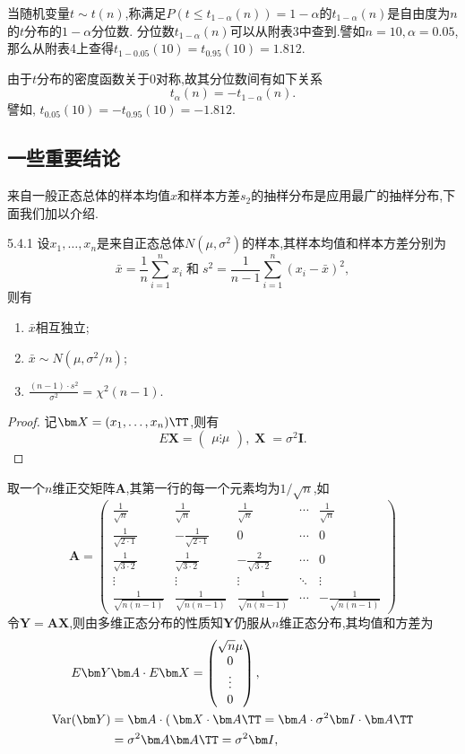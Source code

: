 当随机变量$t\sim t(n)$,称满足$P(t\leq t_{1-\alpha}(n))=1-\alpha$的$t_{1-\alpha}(n)$是自由度为$n$的$t$分布的$1-\alpha$分位数. 分位数$t_{1-\alpha}(n)$可以从附表3中查到.譬如$n=10,\alpha=0.05$,那么从附表4上查得$t_{1-0.05}(10)=t_{0.95}(10)=1.812$.

由于$t$分布的密度函数关于0对称,故其分位数间有如下关系
\begin{equation}\label{eq:5.4.2}
t_\alpha(n)=-t_{1-\alpha}(n).
\end{equation}
譬如, $t_{0.05}(10)=-t_{0.95}(10)=-1.812$.
\subsection{一些重要结论}
来自一般正态总体的样本均值$x$和样本方差$s_2$的抽样分布是应用最广的抽样分布,下面我们加以介绍.
\begin{theorem}{}{5.4.1}
设$x_1,\dotsc,x_n$是来自正态总体$N(\mu,\sigma^2)$的样本,其样本均值和样本方差分别为
\[\bar x=\frac1n\sum_{i=1}^nx_i\;\text{和}\;s^2=\frac1{n-1}\sum_{i=1}^n(x_i-\bar x)^2,\]
则有
\begin{enumerate}[label=(\arabic*)]
\item $\bar x$相互独立;
\item $\bar x\sim N(\mu,\sigma^2/n)$;
\item $\frac{(n-1)\cdot s^2}{\sigma^2}=\chi^2(n-1)$.
\end{enumerate}
\end{theorem}
\begin{proof}
记$\bm X=(x_1,\dotsc,x_n)\TT$,则有
\[E\bm X=\begin{pmatrix}
\mu\vdots\mu
\end{pmatrix},\operatorname{\bm X}=\sigma^2 \bm I.\]
\end{proof}
取一个$n$维正交矩阵$\bm A$,其第一行的每一个元素均为$1/\sqrt n$,如
\[\bm A=\begin{pmatrix}
\frac1{\sqrt n}&\frac{1}{\sqrt n}&\frac1{\sqrt n}&\cdots&\frac1{\sqrt n}\\
\frac1{\sqrt{2\cdot1}}&-\frac1{\sqrt{2\cdot1}}&0&\cdots&0\\
\frac1{\sqrt{3\cdot2}}&\frac1{\sqrt{3\cdot2}}&-\frac2{\sqrt{3\cdot2}}&\cdots&0\\
\vdots&\vdots&\vdots&\ddots&\vdots\\
\frac1{\sqrt{n(n-1)}}&\frac1{\sqrt{n(n-1)}}&\frac1{\sqrt{n(n-1)}}&\cdots&
-\frac1{\sqrt{n(n-1)}}
\end{pmatrix}\]
令$\bm Y=\bm A\bm X$,则由多维正态分布的性质知$\bm Y$仍服从$n$维正态分布,其均值和方差为
\begin{align*}
E\bm Y&\bm A\cdot E\bm X=\begin{pmatrix}
\sqrt n\mu\\0\\\vdots\\0
\end{pmatrix},\\
\operatorname{Var}(\bm Y)&=\bm A\cdot\operatorname(\bm X\cdot\bm A\TT=\bm A\cdot\sigma^2\bm I\cdot \bm A\TT\\
&=\sigma^2\bm A\bm A\TT=\sigma^2\bm I,
\end{align*}
